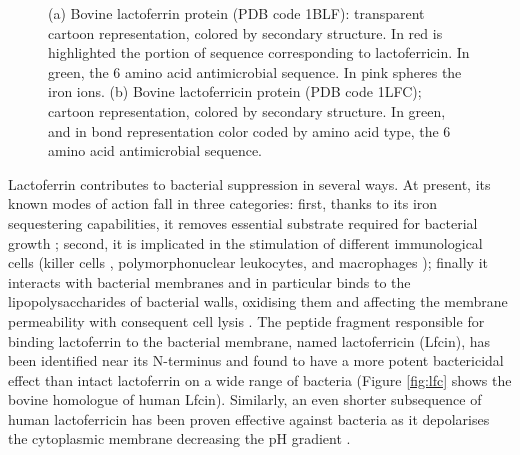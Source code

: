 \begin{figure}
\begin{center}
 \hspace{0.3cm}
\caption[Lactoferrin and lactoferricin proteins]{(a) Bovine lactoferrin protein (PDB code 1BLF): transparent cartoon representation, colored by secondary structure. In red is highlighted the portion of sequence corresponding to lactoferricin. In green, the 6 amino acid antimicrobial sequence. In pink spheres the iron ions. (b) Bovine lactoferricin protein (PDB code 1LFC); cartoon representation, colored by secondary structure. In green, and in bond representation color coded by amino acid type, the 6 amino acid antimicrobial sequence.} \label{fig:blf_lfc}
\end{center}
\end{figure}

Lactoferrin contributes to bacterial suppression in several ways. At present, its known modes of action fall in three categories: first, thanks to its iron sequestering capabilities, it removes essential substrate required for bacterial growth \citep{Farnaud2003}; second, it is implicated in the stimulation of different immunological cells (killer cells \citep{Shau1992}, polymorphonuclear leukocytes, and macrophages \citep{Gahr1991}); finally it interacts with bacterial membranes and in particular binds to the lipopolysaccharides of bacterial walls, oxidising them and affecting the membrane permeability with consequent cell lysis \citep{Farnaud2003}.
The peptide fragment responsible for binding lactoferrin to the bacterial membrane, named lactoferricin (Lfcin), has been identified near its N-terminus and found to have a more potent bactericidal effect than intact lactoferrin on a wide range of bacteria \citep{Gifford2005,Bellamy1992,Tomita1994,Wakabayashi1996} (Figure \ref{fig:lfc} shows the bovine homologue of human Lfcin).
%
Similarly, an even shorter subsequence of human lactoferricin has been proven effective against bacteria as it depolarises the cytoplasmic membrane decreasing the pH gradient \citep{Aguilera1999}.

